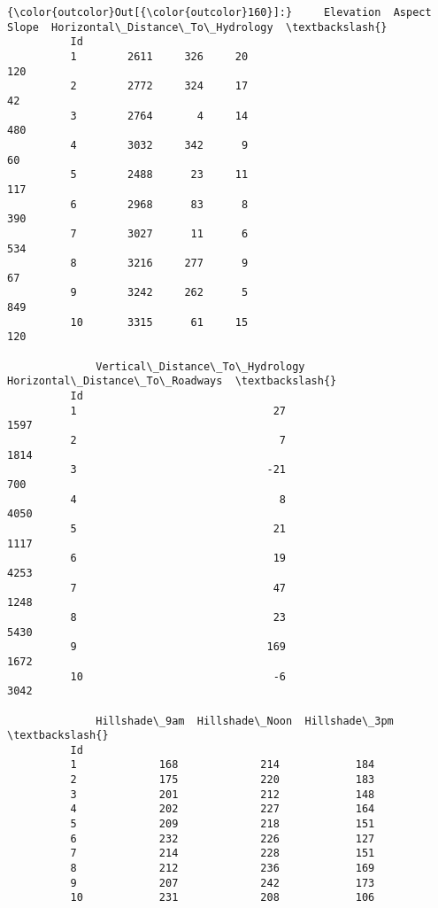 \documentclass[11pt]{article}
\begin{document}
\begin{Verbatim}[commandchars=\\\{\}]
{\color{outcolor}Out[{\color{outcolor}160}]:}     Elevation  Aspect  Slope  Horizontal\_Distance\_To\_Hydrology  \textbackslash{}
          Id                                                               
          1        2611     326     20                               120   
          2        2772     324     17                                42   
          3        2764       4     14                               480   
          4        3032     342      9                                60   
          5        2488      23     11                               117   
          6        2968      83      8                               390   
          7        3027      11      6                               534   
          8        3216     277      9                                67   
          9        3242     262      5                               849   
          10       3315      61     15                               120   
          
              Vertical\_Distance\_To\_Hydrology  Horizontal\_Distance\_To\_Roadways  \textbackslash{}
          Id                                                                    
          1                               27                             1597   
          2                                7                             1814   
          3                              -21                              700   
          4                                8                             4050   
          5                               21                             1117   
          6                               19                             4253   
          7                               47                             1248   
          8                               23                             5430   
          9                              169                             1672   
          10                              -6                             3042   
          
              Hillshade\_9am  Hillshade\_Noon  Hillshade\_3pm  \textbackslash{}
          Id                                                 
          1             168             214            184   
          2             175             220            183   
          3             201             212            148   
          4             202             227            164   
          5             209             218            151   
          6             232             226            127   
          7             214             228            151   
          8             212             236            169   
          9             207             242            173   
          10            231             208            106   
          

\end{Verbatim}
\end{document}
